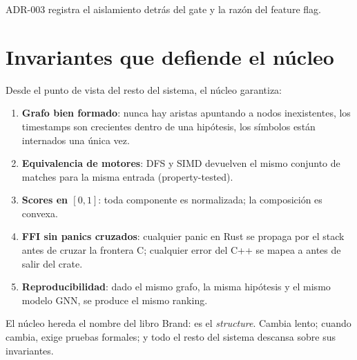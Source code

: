 ADR-003 registra el aislamiento detrás del gate y la razón del
feature flag.

\section{Invariantes que defiende el núcleo}

Desde el punto de vista del resto del sistema, el núcleo garantiza:

\begin{enumerate}
    \item \textbf{Grafo bien formado}: nunca hay aristas apuntando
    a nodos inexistentes, los timestamps son crecientes dentro de
    una hipótesis, los símbolos están internados una única vez.
    \item \textbf{Equivalencia de motores}: DFS y SIMD devuelven el
    mismo conjunto de matches para la misma entrada
    (property-tested).
    \item \textbf{Scores en $[0, 1]$}: toda componente es
    normalizada; la composición es convexa.
    \item \textbf{FFI sin panics cruzados}: cualquier panic en Rust
    se propaga por el stack antes de cruzar la frontera C; cualquier
    error del C++ se mapea a  antes de salir del crate.
    \item \textbf{Reproducibilidad}: dado el mismo grafo, la misma
    hipótesis y el mismo modelo GNN, se produce el mismo ranking.
\end{enumerate}

El núcleo hereda el nombre del libro Brand: es el \emph{structure}.
Cambia lento; cuando cambia, exige pruebas formales; y todo el
resto del sistema descansa sobre sus invariantes.
